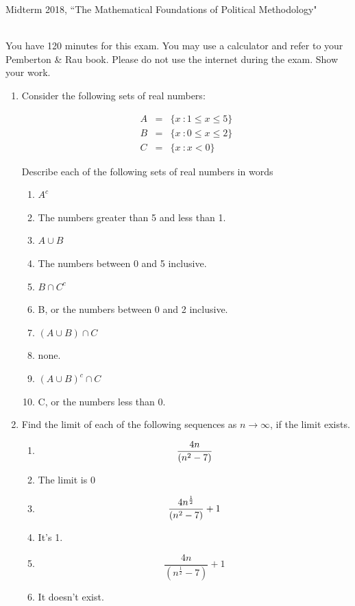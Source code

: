 \documentclass[11pt]{article}
\begin{document}
\noindent \large Midterm 2018, ``The Mathematical Foundations of Political Methodology"

\normalsize
\ \\You have 120 minutes for this exam.  You may use a calculator and refer to your Pemberton \& Rau book.  Please do not use the internet during the exam.  Show your work.

\begin{enumerate}

\item Consider the following sets of real numbers:

\begin{eqnarray}
A&=& \{x\ : 1\leq x\leq 5\} \nonumber\\
B&=& \{x\ : 0\leq x\leq 2\}\nonumber\\
C&=& \{x\ : x<0\}\nonumber
\end{eqnarray}

Describe each of the following sets of real numbers in words
\begin{enumerate}
\item $A^c$
\item[] The numbers greater than 5 and less than 1.

\item $A\cup B$
\item[] The numbers between 0 and 5 inclusive.

\item $B\cap C^c$
\item[] B, or the numbers between 0 and 2 inclusive.
\item $(A\cup B)\cap C$
\item[] none.
\item $(A\cup B)^c\cap C$
\item[] C, or the numbers less than 0.

\end{enumerate}

\vspace{.2in}

\item Find the limit of each of the following sequences as $n\rightarrow \infty$, if the limit exists.
\begin{enumerate}
\item $${{4n}\over{(n^2-7)}}$$
\item[] The limit is 0
\item $${{4n^{\frac{1}{2}}}\over{(n^2-7)}}+1$$
\item[] It's 1.
\item  $$\frac{4n}{(n^{\frac{1}{2}}-7)}+1$$
\item[] It doesn't exist.
\end{enumerate}


\end{enumerate}
\end{document}
